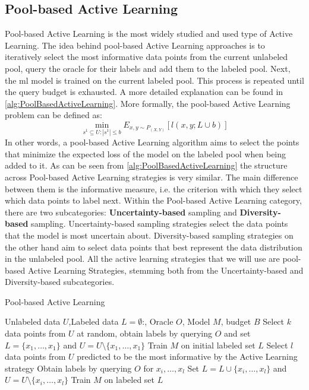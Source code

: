 \subsection{Pool-based Active Learning}
\label{sec:PoolBasedActiveLearning}
Pool-based Active Learning is the most widely studied and used type of Active Learning. The idea behind pool-based Active Learning approaches
is to iteratively select the most informative data points from the current unlabeled pool, query the oracle for their labels and add them to the
labeled pool. Next, the \gls{ml} model is trained on the current labeled pool. This process is repeated until the query budget is exhausted. A more detailed
explanation can be found in \ref{alg:PoolBasedActiveLearning}. More formally, the pool-based Active Learning problem can be defined as:
\begin{equation}
    \min_{s^1 \subseteq U: |s^1| \leq b} E_{x,y \sim P_{(X,Y)}}[l(x,y;L \cup b)]
\end{equation}
In other words, a pool-based Active Learning algorithm aims to select the points that minimize the expected loss of the model on the labeled pool when
being added to it. As can be seen from  \ref{alg:PoolBasedActiveLearning} the structure across Pool-based Active Learning strategies is very similar.
The main difference between them is the informative measure, i.e. the criterion with which they select which data points to label next. Within the 
Pool-based Active Learning category, there are two subcategories: \textbf{Uncertainty-based} sampling and \textbf{Diversity-based} sampling. 
Uncertainty-based sampling strategies select the data points that the model is most uncertain about. Diversity-based sampling strategies on the other
hand aim to select data points that best represent the data distribution in the unlabeled pool. All the active learning strategies that we will use
are pool-based Active Learning Strategies, stemming both from the Uncertainty-based and Diversity-based subcategories.

\begin{algorithm}
    \caption{Pool-based Active Learning} \label{alg:PoolBasedActiveLearning}
    \begin{algorithmic}[1]
        \Require Unlabeled data $U$,Labeled data $L = \emptyset$:, Oracle $O$, Model $M$, budget $B$
        \State Select $k$ data points from $U$ at random, obtain labels by querying $O$ and set $L=\{x_1,\ldots,x_1\}$
        and $U = U \setminus \{x_1,\ldots,x_1\}$ 
        \State Train $M$ on initial labeled set $L$
            \State Select $l$ data points from $U$ predicted to be the most informative by the Active Learning strategy
            \State Obtain labels by querying $O$ for $x_i,\ldots,x_l$
            \State Set $L= L \cup \{x_i,\ldots,x_l\}$ and $U = U \setminus \{x_i,\ldots,x_l\}$
            \State Train $M$ on labeled set $L$
        \EndWhile
    \end{algorithmic}
\end{algorithm}

